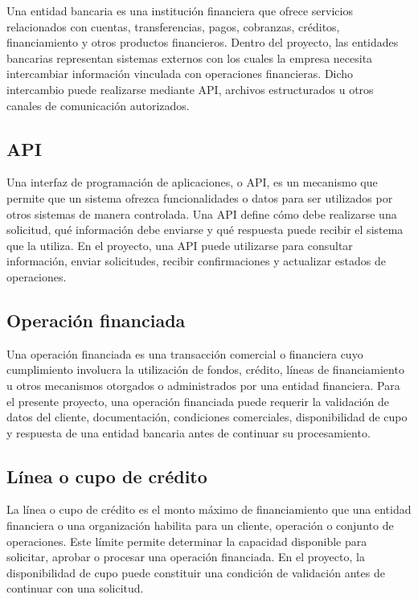 Una entidad bancaria es una institución financiera que ofrece servicios relacionados con cuentas, transferencias, pagos, cobranzas, créditos, financiamiento y otros productos financieros. Dentro del proyecto, las entidades bancarias representan sistemas externos con los cuales la empresa necesita intercambiar información vinculada con operaciones financieras. Dicho intercambio puede realizarse mediante API, archivos estructurados u otros canales de comunicación autorizados.

\subsection{API}

Una interfaz de programación de aplicaciones, o API, es un mecanismo que permite que un sistema ofrezca funcionalidades o datos para ser utilizados por otros sistemas de manera controlada. Una API define cómo debe realizarse una solicitud, qué información debe enviarse y qué respuesta puede recibir el sistema que la utiliza. En el proyecto, una API puede utilizarse para consultar información, enviar solicitudes, recibir confirmaciones y actualizar estados de operaciones.

\subsection{Operación financiada}

Una operación financiada es una transacción comercial o financiera cuyo cumplimiento involucra la utilización de fondos, crédito, líneas de financiamiento u otros mecanismos otorgados o administrados por una entidad financiera. Para el presente proyecto, una operación financiada puede requerir la validación de datos del cliente, documentación, condiciones comerciales, disponibilidad de cupo y respuesta de una entidad bancaria antes de continuar su procesamiento.

\subsection{Línea o cupo de crédito}

La línea o cupo de crédito es el monto máximo de financiamiento que una entidad financiera o una organización habilita para un cliente, operación o conjunto de operaciones. Este límite permite determinar la capacidad disponible para solicitar, aprobar o procesar una operación financiada. En el proyecto, la disponibilidad de cupo puede constituir una condición de validación antes de continuar con una solicitud.

